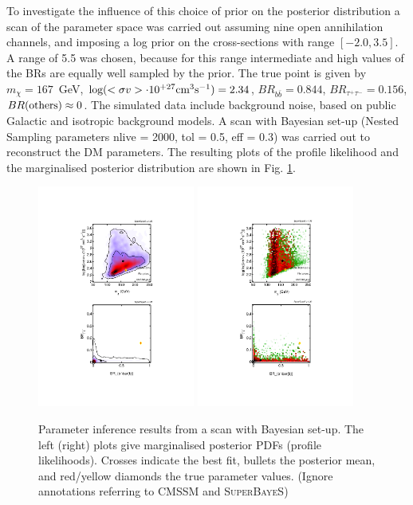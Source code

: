 \documentclass{article}
\begin{document}
To investigate the influence of this choice of prior on the posterior distribution a scan of the parameter space was carried out assuming nine open annihilation channels, and imposing a log prior on the cross-sections with range $[-2.0,3.5]$. A range of 5.5 was chosen, because for this range intermediate and high values of the BRs are equally well sampled by the prior. The true point is given by $m_{\chi} = 167$\ GeV, $\textnormal{log}(<\sigma v> \cdot 10^{+27} \textnormal{cm}^3 \textnormal{s}^{-1}) = 2.34$, $BR_{b \bar{b}} = 0.844$, $BR_{\tau^+ \tau^-} = 0.156$, $BR(\textnormal{others}) \approx 0$. The simulated data include background noise, based on public Galactic and isotropic background models. A scan with Bayesian set-up (Nested Sampling parameters nlive = 2000, tol = 0.5, eff = 0.3) was carried out to reconstruct the DM parameters.
The resulting plots of the profile likelihood and the marginalised posterior distribution are shown in Fig. \ref{Bayesianscan}. 
\begin{figure}
\centering
\includegraphics[trim = 140 120 140 120, clip = true, width=0.46\textwidth]{figs/2D_Posterior}
\includegraphics[trim = 140 120 140 120, clip = true, width=0.46\textwidth]{figs/2D_PL}
\caption{Parameter inference results from a scan with Bayesian set-up. The left (right) plots give marginalised posterior PDFs (profile likelihoods).  Crosses indicate the best fit, bullets the posterior mean, and red/yellow diamonds the true parameter values. (Ignore annotations referring to CMSSM and \textsc{SuperBayeS})}
\label{Bayesianscan}
\end{figure}
\end{document}
